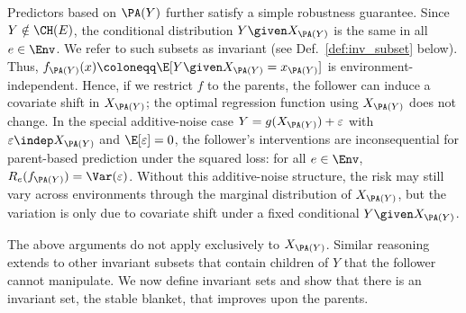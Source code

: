 Predictors based on $\PA(Y)$ further satisfy a simple robustness guarantee. Since $Y \notin \CH(E)$, the conditional distribution $Y \given X_{\PA(Y)}$ is the same in all $e \in \Env$. We refer to such subsets as invariant (see Def.~\ref{def:inv_subset} below). Thus, 
$f_{\PA(Y)}(x) \coloneqq \E[Y \given X_{\PA(Y)} = x_{\PA(Y)}]$
is environment-independent. Hence, if we restrict $f$ to the parents, the follower can induce a covariate shift in $X_{\PA(Y)}$; the optimal regression function using $X_{\PA(Y)}$ does not change.
In the special additive-noise case $Y = g(X_{\PA(Y)}) + \varepsilon$ with $\varepsilon\indep X_{\PA(Y)}$ and $\E[\varepsilon]=0$, the follower's interventions are inconsequential for parent-based prediction under the squared loss: for all $e \in \Env$, $R_e(f_{\PA(Y)})=\Var(\varepsilon)$. Without this additive-noise structure, the risk may still vary across environments through the marginal distribution of $X_{\PA(Y)}$, but the variation is only due to covariate shift under a fixed conditional $Y\given X_{\PA(Y)}$.
 
The above arguments do not apply exclusively
to $X_{\PA(Y)}$. Similar reasoning 
extends to other
invariant subsets that 
contain 
children of $Y$ that the follower cannot manipulate. We now
define invariant sets and
show that there is an invariant set, the stable blanket, that improves upon the parents.

